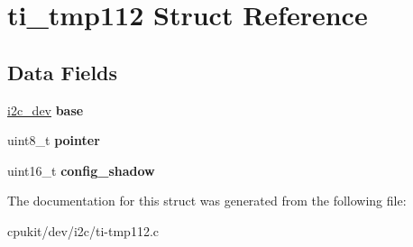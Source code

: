 \hypertarget{structti__tmp112}{}\section{ti\+\_\+tmp112 Struct Reference}
\label{structti__tmp112}
\subsection*{Data Fields}
\begin{DoxyCompactItemize}
\item 
\mbox{\label{structti__tmp112_ae93eab6f2a51d20031288fbe95e62c3e}} 
\mbox{\hyperlink{structi2c__dev}{i2c\+\_\+dev}} {\bfseries base}
\item 
\mbox{\label{structti__tmp112_a4ace0972b4266a78be2428a0e713fc47}} 
uint8\+\_\+t {\bfseries pointer}
\item 
\mbox{\label{structti__tmp112_a4a210a13d44568aa5d35658e771a559a}} 
uint16\+\_\+t {\bfseries config\+\_\+shadow}
\end{DoxyCompactItemize}


The documentation for this struct was generated from the following file\+:\begin{DoxyCompactItemize}
\item 
cpukit/dev/i2c/ti-\/tmp112.\+c\end{DoxyCompactItemize}
